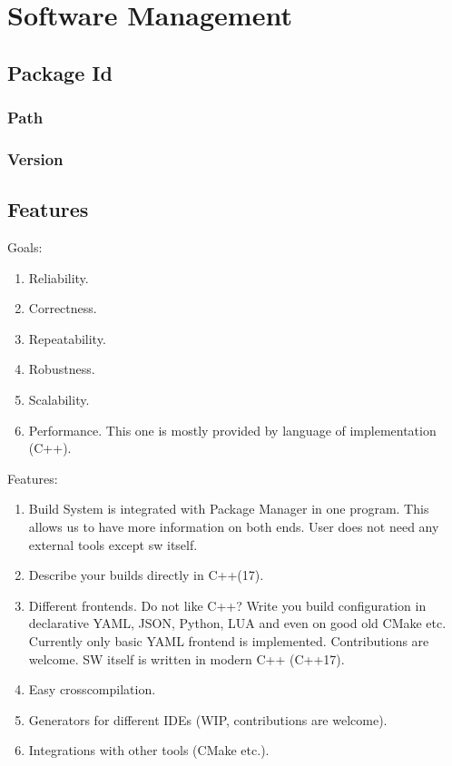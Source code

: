 

\chapter{Software Management}

\section{Package Id}

\subsection{Path}

\subsection{Version}

\section{Features}

Goals:

\begin{enumerate}
\item
Reliability.
\item
Correctness.
\item
Repeatability.
\item
Robustness.
\item
Scalability.
\item
Performance. This one is mostly provided by language of implementation (C++).
\end{enumerate}

Features:

\begin{enumerate}
\item
Build System is integrated with Package Manager in one program. This allows us to have more information on both ends. User does not need any external tools except sw itself.
\item
Describe your builds directly in C++(17).
\item
Different frontends. Do not like C++? Write you build configuration in declarative YAML, JSON, Python, LUA and even on good old CMake etc. Currently only basic YAML frontend is implemented. Contributions are welcome.
SW itself is written in modern C++ (C++17).
\item
Easy crosscompilation.
\item
Generators for different IDEs (WIP, contributions are welcome).
\item
Integrations with other tools (CMake etc.).
\end{enumerate}



